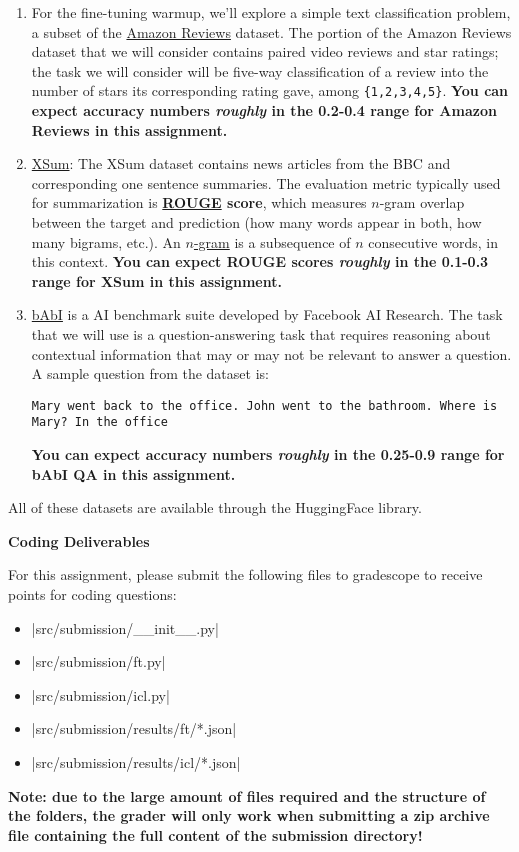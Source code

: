 \begin{enumerate}
    \item For the fine-tuning warmup, we'll explore a simple text classification problem, a subset of the \href{https://huggingface.co/datasets/amazon\_us\_reviews}{Amazon Reviews} dataset. The portion of the Amazon Reviews dataset that we will consider contains paired video reviews and star ratings; the task we will consider will be five-way classification of a review into the number of stars its corresponding rating gave, among \texttt{\{1,2,3,4,5\}}. \textbf{You can expect accuracy numbers \textit{roughly} in the 0.2-0.4 range for Amazon Reviews in this assignment.}
    \item \href{https://huggingface.co/datasets/xsum}{XSum}: The XSum dataset contains news articles from the BBC and corresponding one sentence summaries. The evaluation metric typically used for summarization is \textbf{\href{https://en.wikipedia.org/wiki/ROUGE_(metric)}{ROUGE} score}, which measures $n$-gram overlap between the target and prediction (how many words appear in both, how many bigrams, etc.). An \href{https://en.wikipedia.org/wiki/N-gram#Examples}{$n$-gram} is a subsequence of $n$ consecutive words, in this context.  \textbf{You can expect ROUGE scores \textit{roughly} in the 0.1-0.3 range for XSum in this assignment.}
    \item \href{https://research.facebook.com/downloads/babi/}{bAbI} is a AI benchmark suite developed by Facebook AI Research. The task that we will use is a question-answering task that requires reasoning about contextual information that may or may not be relevant to answer a question. A sample question from the dataset is:
    
    \texttt{Mary went back to the office. John went to the bathroom. Where is Mary? In the office}
    
    \textbf{You can expect accuracy numbers \textit{roughly} in the 0.25-0.9 range for bAbI QA in this assignment.}
\end{enumerate}

All of these datasets are available through the HuggingFace library.

\clearpage

\textbf{Coding Deliverables}

For this assignment, please submit the following files to gradescope to receive points for coding questions:
\begin{itemize}
    \item |src/submission/__init__.py|
    \item |src/submission/ft.py|
    \item |src/submission/icl.py|
    \item |src/submission/results/ft/*.json|
    \item |src/submission/results/icl/*.json|
\end{itemize}

\textbf{Note: due to the large amount of files required and the structure of the folders, the grader will only work when submitting a zip archive file containing the full content of the submission directory!}